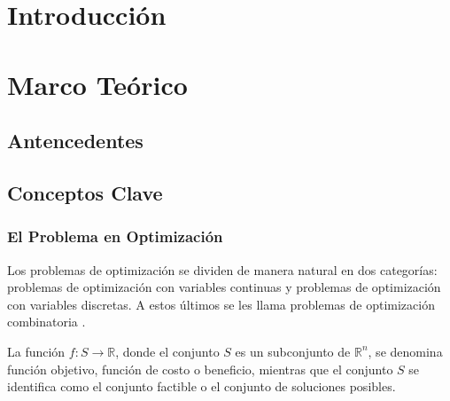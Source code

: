 \documentclass[12pt,titlepage,twoside,openright]{book}
\makeatletter
\def\cleardoublepage{\clearpage\if@twoside \ifodd\c@page\else
\hbox{}
\thispagestyle{empty}
\newpage
\if@twocolumn\hbox{}\newpage\fi\fi\fi}
\makeatother
\begin{document}

\setcounter{tocdepth}{3}
\setcounter{secnumdepth}{3}


\tableofcontents
\cleardoublepage
\listoffigures
\cleardoublepage
\listoftables
\cleardoublepage
\listofmyequations
\cleardoublepage


\mainmatter
\pagestyle{fancy}
\fancyhf{}
\fancyhead[RO,LE]{\bfseries \thepage}
\fancyhead[LO]{\nouppercase{\rightmark}}
\fancyhead[RE]{\nouppercase{\leftmark}}
\fancyfoot{}

\setlength{\parindent}{0pt}
\setlength{\parskip}{1.5ex}

\newcommand{\tab}{\hspace*{1cm}}

\chapter{Introducción}
\label{cap:introduccion}

\chapter{Marco Teórico}
\label{cap:marco-teorico}
\section{Antencedentes}
\section{Conceptos Clave}
\subsection{El Problema en Optimización}

Los problemas de optimización se dividen de manera natural en dos categorías: problemas de optimización con variables continuas y problemas de optimización con variables discretas. A estos últimos se les llama problemas de optimización combinatoria \citep{cobos2010}.

La función \(f : S \to \mathbb{R}\), donde el conjunto \(S\) es un subconjunto de \(\mathbb{R}^n\), se denomina función objetivo, función de costo o beneficio, mientras que el conjunto \(S\) se identifica como el conjunto factible o el conjunto de soluciones posibles.
\end{document}
